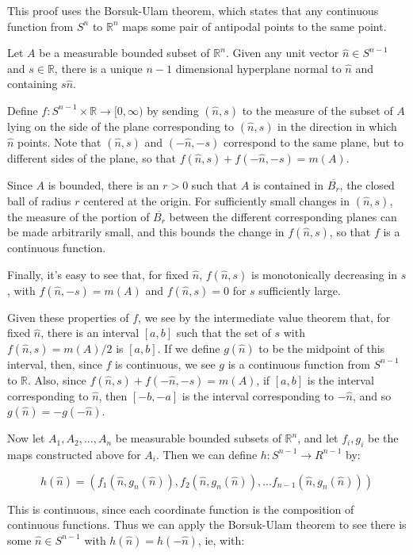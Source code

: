 \documentclass[12pt]{article}
\begin{document}
This proof uses the Borsuk-Ulam theorem, which states that any continuous function from $S^n$ to $\mathbb{R}^n$ maps some pair of antipodal points to the same point.

Let $A$ be a measurable bounded subset of $\mathbb{R}^n$.  Given any unit vector $\hat n \in S^{n-1}$ and $s \in \mathbb{R}$, there is a unique $n-1$ dimensional hyperplane normal to $\hat n$ and containing $s \hat n$.  

Define $f:S^{n-1} \times \mathbb{R} \rightarrow [0,\infty)$ by sending  $(\hat n,s)$ to the measure of the subset of $A$ lying on the side of the plane corresponding to $(\hat n,s)$ in the direction in which $\hat n$ points.  Note that $(\hat n,s)$ and $(-\hat n,-s)$ correspond to the same plane, but to different sides of the plane, so that $f(\hat n,s)+f(-\hat n,-s)=m(A)$.

Since $A$ is bounded, there is an $r>0$ such that $A$ is contained in $\overline{B_r}$, the closed ball of  radius $r$ centered at the origin.  For sufficiently small changes in $(\hat n,s)$, the measure of the portion of $\overline{B_r}$ between the different corresponding planes can be made arbitrarily small, and this bounds the change in $f(\hat n,s)$, so that $f$ is a continuous function.

Finally, it's easy to see that, for fixed $\hat n$, $f(\hat n,s)$ is monotonically decreasing in $s$, with $f(\hat n,-s)=m(A)$ and $f(\hat n,s)=0$  for $s$ sufficiently large.

Given these properties of $f$, we see by the intermediate value theorem that, for fixed $\hat n$, there is an interval $[a,b]$ such that the set of $s$ with $f(\hat n,s)=m(A)/2$ is $[a,b]$.  If we define $g(\hat n)$ to be the midpoint of this interval, then, since $f$ is continuous, we see $g$ is a continuous function from $S^{n-1}$ to $\mathbb{R}$.  Also, since $f(\hat n,s)+f(-\hat n,-s)=m(A)$, if $[a,b]$ is the interval corresponding to $\hat n$, then $[-b,-a]$ is the interval corresponding to $-\hat n$, and so $g(\hat n)=-g(-\hat n)$.

Now let $A_1,A_2,...,A_n$ be measurable bounded subsets of $\mathbb{R}^n$, and let $f_i,g_i$ be the maps constructed above for $A_i$.  Then we can define $h:S^{n-1} \rightarrow R^{n-1}$ by:

\[ h(\hat n) = (f_1(\hat n,g_n(\hat n)),f_2(\hat n,g_n(\hat n)),...f_{n-1}(\hat n,g_n(\hat n))) \]

This is continuous, since each coordinate function is the composition of continuous functions.  Thus we can apply the Borsuk-Ulam theorem to see there is some $\hat n \in S^{n-1}$ with $h(\hat n)=h(-\hat n)$, ie, with:
\end{document}
